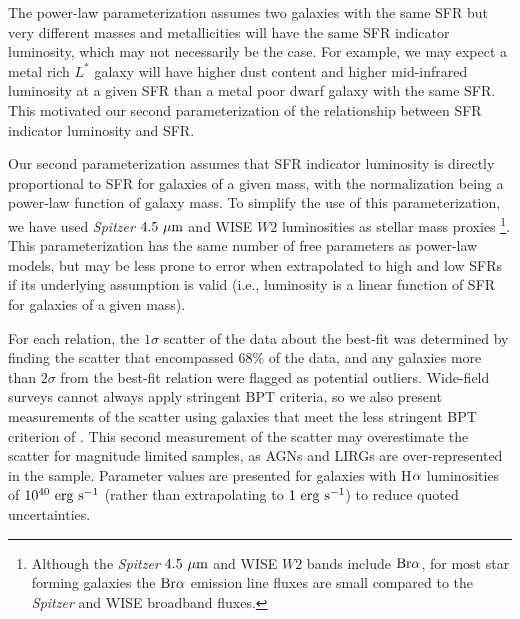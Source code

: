 \documentclass[preprint]{aastex61}
\begin{document}
The power-law parameterization assumes two galaxies with the same SFR but very different masses and metallicities will have the same SFR indicator luminosity, which may not necessarily be the case. For example, we may expect a metal rich $L^*$ galaxy will have higher dust content and higher mid-infrared luminosity at a given SFR than a metal poor dwarf galaxy with the same SFR. This motivated our second parameterization of the relationship between SFR indicator luminosity and SFR. 

Our second parameterization assumes that SFR indicator luminosity is directly proportional to SFR for galaxies of a given mass, with the normalization being a power-law function of galaxy mass. To simplify the use of this parameterization, we have used {\it Spitzer} $4.5~{\rm \mu m}$ and WISE $W2$ luminosities as stellar mass proxies \footnote{Although the {\it Spitzer} $4.5~{\rm \mu m}$ and WISE $W2$ bands include ${\rm Br\alpha}$, for most star forming galaxies the ${\rm Br \alpha}$ emission line fluxes \citep[e.g.,][]{ima10} are small compared to the {\it Spitzer} and WISE broadband fluxes.}. This parameterization has the same number of free parameters as power-law models, but may be less prone to error when extrapolated to high and low SFRs if its underlying assumption is valid (i.e., luminosity is a linear function of SFR for galaxies of a given mass). 


For each relation, the $1\sigma$ scatter of the data about the best-fit was determined by finding the scatter that encompassed 68\% of the data, and any galaxies more than $2\sigma$ from the best-fit relation were flagged as potential outliers. Wide-field surveys cannot always apply stringent BPT criteria, so we also present measurements of the scatter using galaxies that meet the less stringent BPT criterion of \citet{kew01}. This second measurement of the scatter may overestimate the scatter for magnitude limited samples, as AGNs and LIRGs are over-represented in the \citet{bro14} sample. Parameter values are presented for galaxies with H${\rm \alpha}$ luminosities of $10^{40}~{\rm erg~s^{-1}}$ (rather than extrapolating to $1~{\rm erg~s^{-1}}$) to reduce quoted uncertainties.
\end{document}
